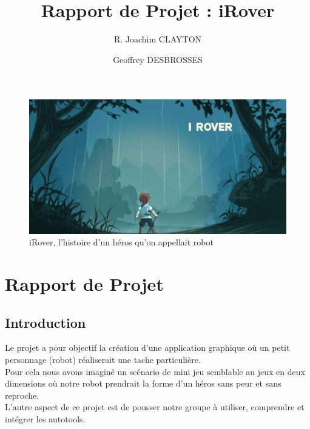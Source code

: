 \documentclass[a4paper 12pts]{article}
\title{Rapport de Projet : iRover}
\author{R. Joachim CLAYTON}
\author{Geoffrey DESBROSSES}
\begin{document}
\maketitle


\begin{figure}[h]
   \includegraphics[width=350pt]{Illustration/proj_irover.jpg}
	\caption{iRover, l'histoire d'un héros qu'on appellait robot}
\end{figure}



\newpage


\renewcommand{\contentsname}{Sommaire} 
\tableofcontents

\newpage








\section{Rapport de Projet}


\vspace{2cm}



\subsection{Introduction}

\vspace{1 cm}


Le projet a pour objectif la création d'une application graphique où un petit personnage (robot) réaliserait une tache particulière.\\
Pour cela nous avons imaginé un scénario de mini jeu semblable au jeux en deux dimensions où notre robot prendrait la forme d'un héros sans peur et sans reproche.\\
L'autre aspect de ce projet est de pousser notre groupe à utiliser, comprendre et intégrer les autotools.
\vspace{1 cm}
\end{document}
